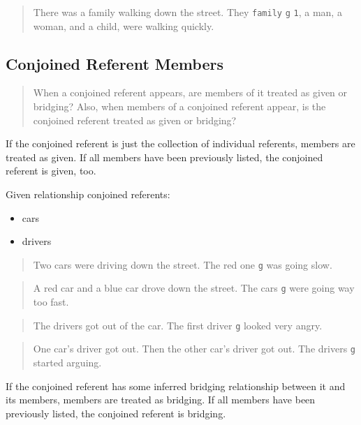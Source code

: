 \documentclass[
]{book}
\providecommand{\tightlist}{%
  \setlength{\itemsep}{0pt}\setlength{\parskip}{0pt}}
\begin{document}
\begin{quote}
There was a family walking down the street.
They \texttt{family} \texttt{g} \texttt{1}, a man, a woman, and a child, were walking quickly.
\end{quote}

\hypertarget{conjoined-referent-members}{%
\subsection{Conjoined Referent Members}\label{conjoined-referent-members}}

\begin{quote}
When a conjoined referent appears, are members of it treated as given or bridging?
Also, when members of a conjoined referent appear, is the conjoined referent treated as given or bridging?
\end{quote}

If the conjoined referent is just the collection of individual referents, members are treated as given.
If all members have been previously listed, the conjoined referent is given, too.

Given relationship conjoined referents:

\begin{itemize}
\tightlist
\item
  cars
\item
  drivers
\end{itemize}

\begin{quote}
Two cars were driving down the street.
The red one \texttt{g} was going slow.
\end{quote}

\begin{quote}
A red car and a blue car drove down the street.
The cars \texttt{g} were going way too fast.
\end{quote}

\begin{quote}
The drivers got out of the car.
The first driver \texttt{g} looked very angry.
\end{quote}

\begin{quote}
One car's driver got out.
Then the other car's driver got out.
The drivers \texttt{g} started arguing.
\end{quote}

If the conjoined referent has some inferred bridging relationship between it and its members, members are treated as bridging.
If all members have been previously listed, the conjoined referent is bridging.
\end{document}
